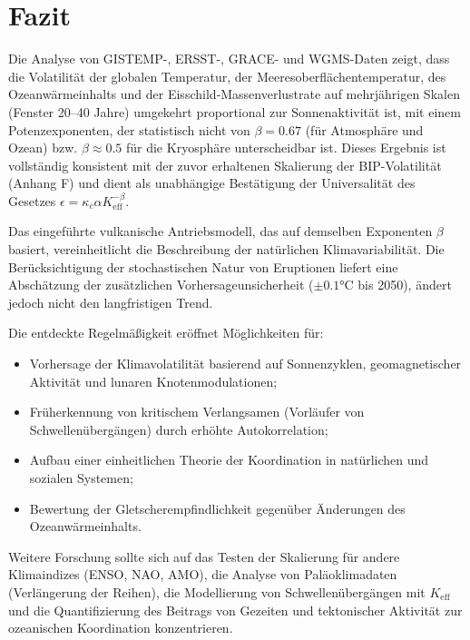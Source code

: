 \documentclass[12pt,a4paper]{article}
\newcommand{\Keff}{K_{\mathrm{eff}}}
\newcommand{\kappac}{\kappa_c}
\newcommand{\be}{\beta}
\begin{document}
	\section{Fazit}
	
	Die Analyse von GISTEMP-, ERSST-, GRACE- und WGMS-Daten zeigt, dass die Volatilität der globalen Temperatur, der Meeresoberflächentemperatur, des Ozeanwärmeinhalts und der Eisschild‑Massenverlustrate auf mehrjährigen Skalen (Fenster 20–40 Jahre) umgekehrt proportional zur Sonnenaktivität ist, mit einem Potenzexponenten, der statistisch nicht von \(\be = 0.67\) (für Atmosphäre und Ozean) bzw. \(\be \approx 0.5\) für die Kryosphäre unterscheidbar ist. Dieses Ergebnis ist vollständig konsistent mit der zuvor erhaltenen Skalierung der BIP-Volatilität (Anhang F) und dient als unabhängige Bestätigung der Universalität des Gesetzes \(\epsilon = \kappac \alpha \Keff^{-\be}\).
	
	Das eingeführte vulkanische Antriebsmodell, das auf demselben Exponenten \(\beta\) basiert, vereinheitlicht die Beschreibung der natürlichen Klimavariabilität. Die Berücksichtigung der stochastischen Natur von Eruptionen liefert eine Abschätzung der zusätzlichen Vorhersageunsicherheit (\(\pm0.1\)°C bis 2050), ändert jedoch nicht den langfristigen Trend.
	
	Die entdeckte Regelmäßigkeit eröffnet Möglichkeiten für:
	\begin{itemize}
		\item Vorhersage der Klimavolatilität basierend auf Sonnenzyklen, geomagnetischer Aktivität und lunaren Knotenmodulationen;
		\item Früherkennung von kritischem Verlangsamen (Vorläufer von Schwellenübergängen) durch erhöhte Autokorrelation;
		\item Aufbau einer einheitlichen Theorie der Koordination in natürlichen und sozialen Systemen;
		\item Bewertung der Gletscherempfindlichkeit gegenüber Änderungen des Ozeanwärmeinhalts.
	\end{itemize}
	
	Weitere Forschung sollte sich auf das Testen der Skalierung für andere Klimaindizes (ENSO, NAO, AMO), die Analyse von Paläoklimadaten (Verlängerung der Reihen), die Modellierung von Schwellenübergängen mit \(\Keff\) und die Quantifizierung des Beitrags von Gezeiten und tektonischer Aktivität zur ozeanischen Koordination konzentrieren.
	
\end{document}
